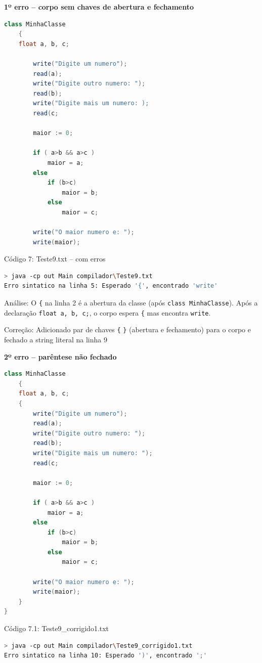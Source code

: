 \documentclass[12pt,a4paper]{article}
\begin{document}
\textbf{1º erro -- corpo sem chaves de abertura e fechamento}

\begin{lstlisting}[language=Java]
class MinhaClasse
    {
    float a, b, c;

        write("Digite um numero");
        read(a);
        write("Digite outro numero: ");
        read(b);
        write("Digite mais um numero: );
        read(c;

        maior := 0;

        if ( a>b && a>c )
            maior = a;
        else
            if (b>c)
                maior = b;
            else
                maior = c;

        write("O maior numero e: ");
        write(maior);
\end{lstlisting}

Código 7: Teste9.txt -- com erros

\begin{lstlisting}[language=bash]
> java -cp out Main compilador\Teste9.txt
Erro sintatico na linha 5: Esperado '{', encontrado 'write'
\end{lstlisting}

Análise: O \texttt{\{} na linha 2 é a abertura da classe (após \texttt{class MinhaClasse}). Após a declaração \texttt{float a, b, c;}, o corpo espera \texttt{\{} mas encontra \texttt{write}.

Correção: Adicionado par de chaves \texttt{\{} \texttt{\}} (abertura e fechamento) para o corpo e fechado a string literal na linha 9

\textbf{2º erro -- parêntese não fechado}

\begin{lstlisting}[language=Java]
class MinhaClasse
    {
    float a, b, c;
    {
        write("Digite um numero");
        read(a);
        write("Digite outro numero: ");
        read(b);
        write("Digite mais um numero: ");
        read(c;

        maior := 0;

        if ( a>b && a>c )
            maior = a;
        else
            if (b>c)
                maior = b;
            else
                maior = c;

        write("O maior numero e: ");
        write(maior);
    }
}
\end{lstlisting}

Código 7.1: Teste9\_corrigido1.txt

\begin{lstlisting}[language=bash]
> java -cp out Main compilador\Teste9_corrigido1.txt
Erro sintatico na linha 10: Esperado ')', encontrado ';'
\end{lstlisting}
\end{document}

